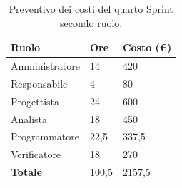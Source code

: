 \begin{table}[ht!]
	\centering
	\begin{tabular}{p{4cm} p{1cm} p{2cm}}
        \toprule
        \textbf{Ruolo} & \textbf{Ore} & \textbf{Costo (€)} \\
        \midrule
        Amministratore & 14 & 420 \\
        Responsabile & 4 & 80 \\
        Progettista & 24 & 600 \\
        Analista & 18 & 450 \\
        Programmatore & 22,5 & 337,5 \\
        Verificatore & 18 & 270 \\
        \bottomrule
        \textbf{Totale} & 100,5 & 2157,5
    \end{tabular}
    \caption{Preventivo dei costi del quarto Sprint secondo ruolo.}
	\label{table:Preventivo dei costi del quarto Sprint secondo ruolo}
\end{table}
